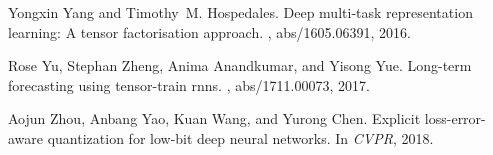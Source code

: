 \documentclass[10pt,twocolumn,letterpaper]{article}
\begin{document}
{\begin{thebibliography}{10}
Yongxin Yang and Timothy~M. Hospedales.
\newblock Deep multi-task representation learning: {A} tensor factorisation
  approach.
, abs/1605.06391, 2016.

Rose Yu, Stephan Zheng, Anima Anandkumar, and Yisong Yue.
\newblock Long-term forecasting using tensor-train rnns.
, abs/1711.00073, 2017.

Aojun Zhou, Anbang Yao, Kuan Wang, and Yurong Chen.
\newblock Explicit loss-error-aware quantization for low-bit deep neural
  networks.
\newblock In {\em CVPR}, 2018.

\end{thebibliography}
 
}
\end{document}
